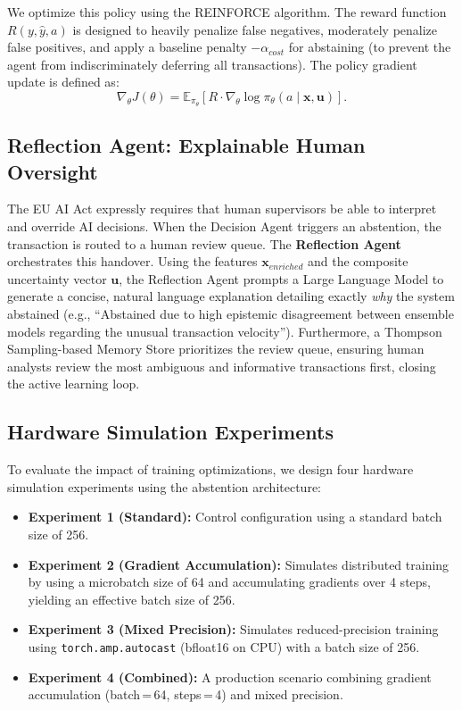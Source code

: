\documentclass[12pt,a4paper]{article}
\begin{document}
We optimize this policy using the REINFORCE algorithm. The reward function
$R(y,\hat{y},a)$ is designed to heavily penalize false negatives, moderately
penalize false positives, and apply a baseline penalty $-\alpha_{cost}$ for
abstaining (to prevent the agent from indiscriminately deferring all
transactions). The policy gradient update is defined as:
\begin{equation}
  \nabla_\theta J(\theta) =
    \mathbb{E}_{\pi_\theta}\!\left[
      R\cdot\nabla_\theta\log\pi_\theta(a\mid\mathbf{x},\mathbf{u})
    \right].
  \label{eq:reinforce}
\end{equation}

\subsection{Reflection Agent: Explainable Human Oversight}

The EU AI Act expressly requires that human supervisors be able to interpret and
override AI decisions. When the Decision Agent triggers an abstention, the
transaction is routed to a human review queue. The \textbf{Reflection Agent}
orchestrates this handover. Using the features $\mathbf{x}_{enriched}$ and the
composite uncertainty vector $\mathbf{u}$, the Reflection Agent prompts a Large
Language Model to generate a concise, natural language explanation detailing
exactly \textit{why} the system abstained (e.g., ``Abstained due to high
epistemic disagreement between ensemble models regarding the unusual transaction
velocity''). Furthermore, a Thompson Sampling-based Memory Store prioritizes the
review queue, ensuring human analysts review the most ambiguous and informative
transactions first, closing the active learning loop.

\subsection{Hardware Simulation Experiments}

To evaluate the impact of training optimizations, we design four hardware
simulation experiments using the abstention architecture:
\begin{itemize}
  \item \textbf{Experiment 1 (Standard):} Control configuration using a standard
        batch size of 256.
  \item \textbf{Experiment 2 (Gradient Accumulation):} Simulates distributed
        training by using a microbatch size of 64 and accumulating gradients
        over 4 steps, yielding an effective batch size of 256.
  \item \textbf{Experiment 3 (Mixed Precision):} Simulates reduced-precision
        training using \texttt{torch.amp.autocast} (bfloat16 on CPU) with a
        batch size of 256.
  \item \textbf{Experiment 4 (Combined):} A production scenario combining
        gradient accumulation (batch\,=\,64, steps\,=\,4) and mixed precision.
\end{itemize}
\end{document}
